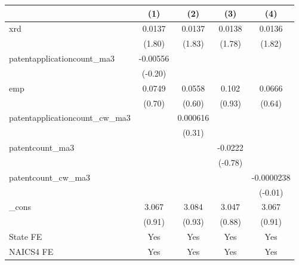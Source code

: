 {
\def\sym#1{\ifmmode^{#1}\else\(^{#1}\)\fi}
\begin{tabular}{l*{4}{c}}
\hline\hline
            &\multicolumn{1}{c}{(1)}         &\multicolumn{1}{c}{(2)}         &\multicolumn{1}{c}{(3)}         &\multicolumn{1}{c}{(4)}         \\
\hline
xrd         &      0.0137         &      0.0137         &      0.0138         &      0.0136         \\
            &      (1.80)         &      (1.83)         &      (1.78)         &      (1.82)         \\
[1em]
patentapplicationcount\_ma3&    -0.00556         &                     &                     &                     \\
            &     (-0.20)         &                     &                     &                     \\
[1em]
emp         &      0.0749         &      0.0558         &       0.102         &      0.0666         \\
            &      (0.70)         &      (0.60)         &      (0.93)         &      (0.64)         \\
[1em]
patentapplicationcount\_cw\_ma3&                     &    0.000616         &                     &                     \\
            &                     &      (0.31)         &                     &                     \\
[1em]
patentcount\_ma3&                     &                     &     -0.0222         &                     \\
            &                     &                     &     (-0.78)         &                     \\
[1em]
patentcount\_cw\_ma3&                     &                     &                     &  -0.0000238         \\
            &                     &                     &                     &     (-0.01)         \\
[1em]
\_cons      &       3.067         &       3.084         &       3.047         &       3.067         \\
            &      (0.91)         &      (0.93)         &      (0.88)         &      (0.91)         \\
[1em]
State FE    &         Yes         &         Yes         &         Yes         &         Yes         \\
[1em]
NAICS4 FE   &         Yes         &         Yes         &         Yes         &         Yes         \\

\end{tabular}}
